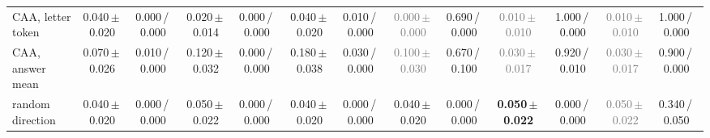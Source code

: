 \begin{tabular}{@{}lcccccccccccc@{}}
CAA, letter token & 0.040\,{\scriptsize$\pm$\,0.020} & {\scriptsize 0.000\,/\,0.000} & 0.020\,{\scriptsize$\pm$\,0.014} & {\scriptsize 0.000\,/\,0.000} & 0.040\,{\scriptsize$\pm$\,0.020} & {\scriptsize 0.010\,/\,0.000} & \textcolor{gray}{0.000\,{\scriptsize$\pm$\,0.000}} & {\scriptsize 0.690\,/\,0.000} & \textcolor{gray}{0.010\,{\scriptsize$\pm$\,0.010}} & {\scriptsize 1.000\,/\,0.000} & \textcolor{gray}{0.010\,{\scriptsize$\pm$\,0.010}} & {\scriptsize 1.000\,/\,0.000} \\
CAA, answer mean & 0.070\,{\scriptsize$\pm$\,0.026} & {\scriptsize 0.010\,/\,0.000} & 0.120\,{\scriptsize$\pm$\,0.032} & {\scriptsize 0.000\,/\,0.000} & 0.180\,{\scriptsize$\pm$\,0.038} & {\scriptsize 0.030\,/\,0.000} & \textcolor{gray}{0.100\,{\scriptsize$\pm$\,0.030}} & {\scriptsize 0.670\,/\,0.100} & \textcolor{gray}{0.030\,{\scriptsize$\pm$\,0.017}} & {\scriptsize 0.920\,/\,0.010} & \textcolor{gray}{0.030\,{\scriptsize$\pm$\,0.017}} & {\scriptsize 0.900\,/\,0.000} \\
random direction & 0.040\,{\scriptsize$\pm$\,0.020} & {\scriptsize 0.000\,/\,0.000} & 0.050\,{\scriptsize$\pm$\,0.022} & {\scriptsize 0.000\,/\,0.000} & 0.040\,{\scriptsize$\pm$\,0.020} & {\scriptsize 0.000\,/\,0.000} & 0.040\,{\scriptsize$\pm$\,0.020} & {\scriptsize 0.000\,/\,0.000} & \textbf{0.050\,{\scriptsize$\pm$\,0.022}} & {\scriptsize 0.000\,/\,0.000} & \textcolor{gray}{0.050\,{\scriptsize$\pm$\,0.022}} & {\scriptsize 0.340\,/\,0.050} \\
\bottomrule
\end{tabular}

